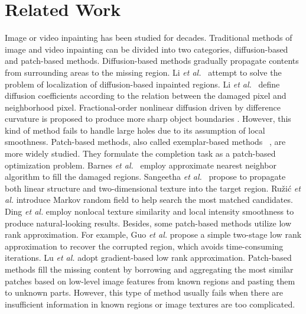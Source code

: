 




\section{Related Work}
Image or video inpainting has been studied for decades. 
Traditional methods of image and video inpainting can be divided into two categories, diffusion-based and patch-based methods. 
Diffusion-based methods \cite{bertalmio2000image,ballester2001filling} gradually propagate contents from surrounding areas to the missing region. 
Li \emph{et al.}~\cite{li2017localization} attempt to solve the problem of localization of diffusion-based inpainted regions.
Li \emph{et al.}~\cite{li2016image} define diffusion coefficients according to the relation between the damaged pixel and neighborhood pixel.
Fractional-order nonlinear diffusion driven by difference curvature is proposed to produce more sharp object boundaries \cite{sridevi2019image}. 
However, this kind of method fails to handle large holes due to its assumption of local smoothness. 
%
Patch-based methods, also called exemplar-based methods ~\cite{bertalmio2003simultaneous,efros2001image}, are more widely studied.
They formulate the completion task as a patch-based optimization problem. 
Barnes \emph{et al.}~\cite{barnes2009patchmatch} employ approximate nearest neighbor algorithm to fill the damaged regions.
Sangeetha \emph{et al.}~\cite{sangeetha2011combined} propose to propagate both linear structure and two-dimensional texture into the target region.
Ru{\v{z}}i{\'c} \emph{et al.} \cite{ruvzic2014context} introduce Markov random field to help search the most matched candidates.
Ding \emph{et al.} \cite{ding_19nonlocal} employ nonlocal texture similarity and local intensity smoothness to produce natural-looking results.
Besides, some patch-based methods utilize low rank approximation. For example, Guo \emph{et al.} \cite{pb_lowrank2018} propose a simple two-stage low rank approximation to recover the corrupted region, which avoids time-consuming iterations.
Lu \emph{et al.} \cite{lu2018gradient} adopt gradient-based low rank approximation.
Patch-based  methods fill the missing content by borrowing and aggregating the most similar patches based on low-level image features from known regions and pasting them to unknown parts. However, this type of method usually fails when there are insufficient information in known regions or image textures are too complicated.  
%

